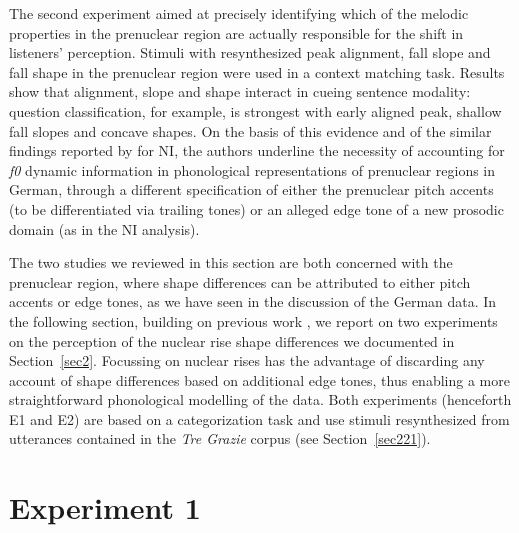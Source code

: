 The second experiment aimed at precisely identifying which of the melodic properties in the prenuclear region are actually responsible for the shift in listeners' perception. Stimuli with resynthesized peak alignment, fall slope and fall shape in the prenuclear region were used in a context matching task. Results show that alignment, slope and shape interact in cueing sentence modality: question classification, for example, is strongest with early aligned peak, shallow fall slopes and concave shapes. On the basis of this evidence and of the similar findings reported by \citet{petrone2011tones} for NI, the authors underline the necessity of accounting for \textit{f0} dynamic information in phonological representations of prenuclear regions in German, through a different specification of either the prenuclear pitch accents (to be differentiated via trailing tones) or an alleged edge tone of a new prosodic domain (as in the NI analysis).

The two studies we reviewed in this section are both concerned with the prenuclear region, where shape differences can be attributed to either pitch accents or edge tones, as we have seen in the discussion of the German data. In the following section, building on previous work \citep{dimperio2009interplay}, we report on two experiments on the perception of the nuclear rise shape differences we documented in Section~\ref{sec2}. Focussing on nuclear rises has the advantage of discarding any account of shape differences based on additional edge tones, thus enabling a more straightforward phonological modelling of the data. Both experiments (henceforth E1 and E2) are based on a categorization task and use stimuli resynthesized from utterances contained in the \textit{Tre Grazie} corpus (see Section~\ref{sec221}).

\section{Experiment 1}\label{sec32}
